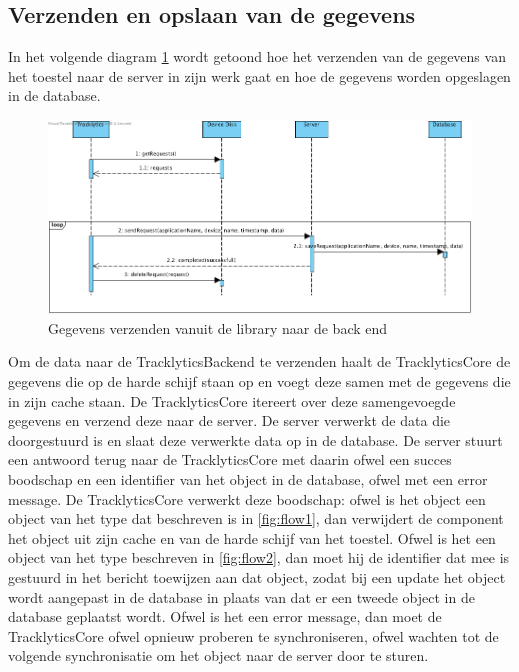 \subsection{Verzenden en opslaan van de gegevens} \label{sec:VerzendenEnOpslaanVanGegevens}
In het volgende diagram \ref{fig:flow3} wordt getoond hoe het verzenden van de gegevens van het toestel naar de server in zijn werk gaat en hoe de gegevens worden opgeslagen in de database. \\
\begin{figure}[!h]
  \centering
  \includegraphics[scale=0.4]{Afbeeldingen/Architectuur/FlowDiagram3}
  \caption{Gegevens verzenden vanuit de library naar de back end}
  \label{fig:flow3}
\end{figure}

Om de data naar de TracklyticsBackend te verzenden haalt de TracklyticsCore de gegevens die op de harde schijf staan op en voegt deze samen met de gegevens die in zijn cache staan. De TracklyticsCore itereert over deze samengevoegde gegevens en verzend deze naar de server. De server verwerkt de data die doorgestuurd is en slaat deze verwerkte data op in de database. De server stuurt een antwoord terug naar de TracklyticsCore met daarin ofwel een succes boodschap en een identifier van het object in de database, ofwel met een error message. De TracklyticsCore verwerkt deze boodschap: ofwel is het object een object van het type dat beschreven is in \ref{fig:flow1}, dan verwijdert de component het object uit zijn cache en van de harde schijf van het toestel. Ofwel is het een object van het type beschreven in \ref{fig:flow2}, dan moet hij de identifier dat mee is gestuurd in het bericht toewijzen aan dat object, zodat bij een update het object wordt aangepast in de database in plaats van dat er een tweede object in de database geplaatst wordt. Ofwel is het een error message, dan moet de TracklyticsCore ofwel opnieuw proberen te synchroniseren, ofwel wachten tot de volgende synchronisatie om het object naar de server door te sturen.\\

